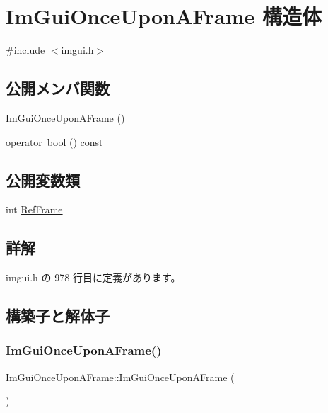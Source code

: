 \hypertarget{struct_im_gui_once_upon_a_frame}{}\section{Im\+Gui\+Once\+Upon\+A\+Frame 構造体}
\label{struct_im_gui_once_upon_a_frame}


{\ttfamily \#include $<$imgui.\+h$>$}

\subsection*{公開メンバ関数}
\begin{DoxyCompactItemize}
\item 
\mbox{\hyperlink{struct_im_gui_once_upon_a_frame_ac9513f72a884f6fe844869b157b23f1f}{Im\+Gui\+Once\+Upon\+A\+Frame}} ()
\item 
\mbox{\hyperlink{struct_im_gui_once_upon_a_frame_a3c912b79bc333ce746356001431c2504}{operator bool}} () const
\end{DoxyCompactItemize}
\subsection*{公開変数類}
\begin{DoxyCompactItemize}
\item 
int \mbox{\hyperlink{struct_im_gui_once_upon_a_frame_a2d44776b8e7bdeec217f88be9f832e08}{Ref\+Frame}}
\end{DoxyCompactItemize}


\subsection{詳解}


 imgui.\+h の 978 行目に定義があります。



\subsection{構築子と解体子}
\mbox{\label{struct_im_gui_once_upon_a_frame_ac9513f72a884f6fe844869b157b23f1f}} 
\subsubsection{\texorpdfstring{Im\+Gui\+Once\+Upon\+A\+Frame()}{ImGuiOnceUponAFrame()}}
{\footnotesize\ttfamily Im\+Gui\+Once\+Upon\+A\+Frame\+::\+Im\+Gui\+Once\+Upon\+A\+Frame (\begin{DoxyParamCaption}{ }\end{DoxyParamCaption})\hspace{0.3cm}{\ttfamily [inline]}}



